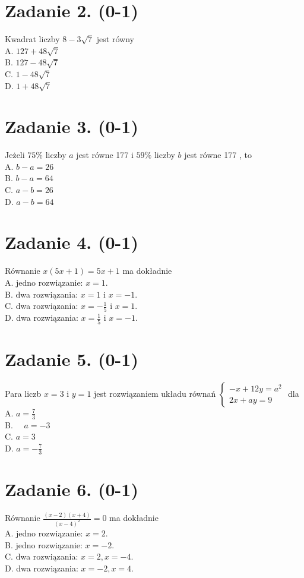 \documentclass[10pt]{article}
\begin{document}
\section*{Zadanie 2. (0-1)}
Kwadrat liczby \(8-3 \sqrt{7}\) jest równy\\
A. \(127+48 \sqrt{7}\)\\
B. \(127-48 \sqrt{7}\)\\
C. \(1-48 \sqrt{7}\)\\
D. \(1+48 \sqrt{7}\)

\section*{Zadanie 3. (0-1)}
Jeżeli \(75 \%\) liczby \(a\) jest równe 177 i \(59 \%\) liczby \(b\) jest równe 177 , to\\
A. \(b-a=26\)\\
B. \(b-a=64\)\\
C. \(a-b=26\)\\
D. \(a-b=64\)

\section*{Zadanie 4. (0-1)}
Równanie \(x(5 x+1)=5 x+1\) ma dokładnie\\
A. jedno rozwiązanie: \(x=1\).\\
B. dwa rozwiązania: \(x=1\) i \(x=-1\).\\
C. dwa rozwiązania: \(x=-\frac{1}{5}\) i \(x=1\).\\
D. dwa rozwiązania: \(x=\frac{1}{5}\) i \(x=-1\).

\section*{Zadanie 5. (0-1)}
Para liczb \(x=3\) i \(y=1\) jest rozwiązaniem układu równań \(\left\{\begin{array}{c}-x+12 y=a^{2} \\ 2 x+a y=9\end{array}\right.\) dla\\
A. \(a=\frac{7}{3}\)\\
B. \(\quad a=-3\)\\
C. \(a=3\)\\
D. \(a=-\frac{7}{3}\)

\section*{Zadanie 6. (0-1)}
Równanie \(\frac{(x-2)(x+4)}{(x-4)^{2}}=0\) ma dokładnie\\
A. jedno rozwiązanie: \(x=2\).\\
B. jedno rozwiązanie: \(x=-2\).\\
C. dwa rozwiązania: \(x=2, x=-4\).\\
D. dwa rozwiązania: \(x=-2, x=4\).
\end{document}
